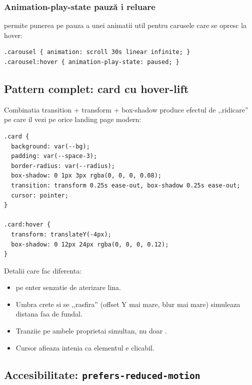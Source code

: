 \subsubsection{Animation-play-state \textendash{} pauz\u a i reluare}

 permite punerea pe pauza a unei animatii \textendash{} util pentru carusele care se opresc la hover:

\begin{lstlisting}[style=css, numbers=none]
.carousel { animation: scroll 30s linear infinite; }
.carousel:hover { animation-play-state: paused; }
\end{lstlisting}

\subsection{Pattern complet: card cu hover-lift}

Combinatia transition + transform + box-shadow produce efectul de ,,ridicare'' pe care il vezi pe orice landing page modern:

\begin{lstlisting}[style=css, caption={Hover-lift, pattern de baz\u a pentru carduri}]
.card {
  background: var(--bg);
  padding: var(--space-3);
  border-radius: var(--radius);
  box-shadow: 0 1px 3px rgba(0, 0, 0, 0.08);
  transition: transform 0.25s ease-out, box-shadow 0.25s ease-out;
  cursor: pointer;
}

.card:hover {
  transform: translateY(-4px);
  box-shadow: 0 12px 24px rgba(0, 0, 0, 0.12);
}
\end{lstlisting}

Detalii care fac diferenta:
\begin{itemize}[itemsep=1pt]
  \item {} pe enter \textendash{} senzatie de aterizare lina.
  \item Umbra crete si se ,,rasfira'' (offset Y mai mare, blur mai mare) \textendash{} simuleaza distana faa de fundal.
  \item Tranziie pe ambele proprietai simultan, nu doar .
  \item Cursor  \textendash{} afieaza intenia ca elementul e clicabil.
\end{itemize}

\subsection{Accesibilitate: \texttt{prefers-reduced-motion}}

